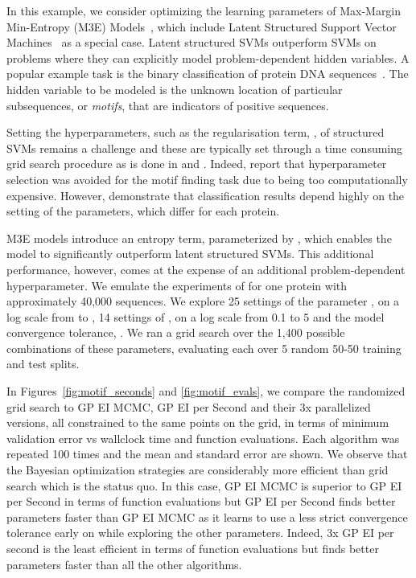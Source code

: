 \documentclass[aos,preprint]{imsart}
\begin{document}
In this example, we consider optimizing the learning parameters of
Max-Margin Min-Entropy (M3E) Models~\citep{Miller-etal-2012}, which
include Latent Structured Support Vector
Machines~\citep{Yu-Joachims-2009} as a special case.  Latent structured
SVMs outperform SVMs on problems where they can explicitly model
problem-dependent hidden variables. A popular example task is the
binary classification of protein DNA
sequences~\citep{Miller-etal-2012,Kumar-etal-2010,Yu-Joachims-2009}.
The hidden variable to be modeled is the unknown location of
particular subsequences, or \emph{motifs}, that are indicators of
positive sequences.

Setting the hyperparameters, such as the regularisation term, , of
structured SVMs remains a challenge and these are typically set
through a time consuming grid search procedure as is done in
\citet{Miller-etal-2012} and \citet{Yu-Joachims-2009}. Indeed,
\citet{Kumar-etal-2010} report that hyperparameter selection was
avoided for the motif finding task due to being too computationally
expensive.  However, \citet{Miller-etal-2012} demonstrate that
classification results depend highly on the setting of the parameters,
which differ for each protein.

M3E models introduce an entropy term, parameterized by , which
enables the model to significantly outperform latent structured
SVMs. This additional performance, however, comes at the expense of an
additional problem-dependent hyperparameter.  We emulate the
experiments of \citet{Miller-etal-2012} for one protein with
approximately 40,000 sequences. We explore 25 settings of the
parameter , on a log scale from  to , 14 settings of
, on a log scale from 0.1 to 5 and the model convergence
tolerance, .  We ran a grid search
over the 1,400 possible combinations of these parameters, evaluating
each over 5 random 50-50 training and test splits.

In Figures~\ref{fig:motif_seconds} and \ref{fig:motif_evals}, we
compare the randomized grid search to GP EI MCMC, GP EI per Second and
their 3x parallelized versions, all constrained to the same points on
the grid, in terms of minimum validation error vs wallclock time and
function evaluations. Each algorithm was repeated 100 times and the
mean and standard error are shown. We observe that the Bayesian
optimization strategies are considerably more efficient than grid
search which is the status quo. In this case, GP EI MCMC is superior
to GP EI per Second in terms of function evaluations but GP EI per
Second finds better parameters faster than GP EI MCMC as it learns to
use a less strict convergence tolerance early on while exploring the
other parameters. Indeed, 3x GP EI per second is the least efficient
in terms of function evaluations but finds better parameters faster
than all the other algorithms.
\end{document}
